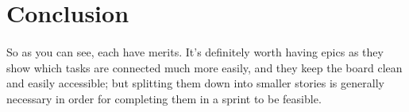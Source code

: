 \documentclass{scrartcl}
\begin{document}
\paragraph{}

\section{Conclusion}
\paragraph{}
So as you can see, each have merits. It's definitely worth having epics as they show which tasks are connected much more easily, and they keep the board clean and easily accessible; but splitting them down into smaller stories is generally necessary in order for completing them in a sprint to be feasible.



\end{document}
